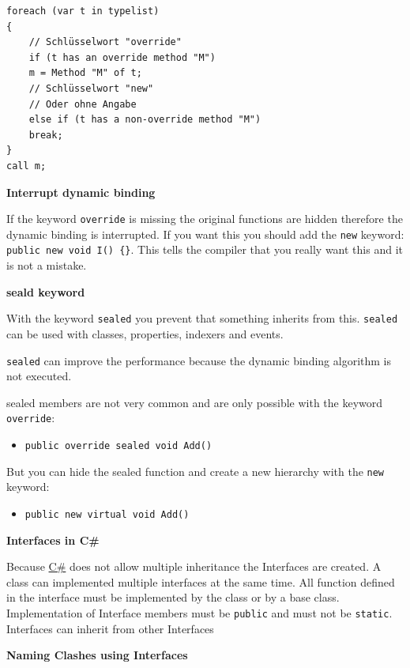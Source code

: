 \documentclass[11pt,twoside,landscape]{article}
\begin{document}
\begin{multicols}{3}
\begin{lstlisting}
foreach (var t in typelist)
{
    // Schlüsselwort "override"
    if (t has an override method "M")
	m = Method "M" of t;
    // Schlüsselwort "new"
    // Oder ohne Angabe
    else if (t has a non-override method "M")
	break;
}
call m;
\end{lstlisting}

\textbf{Interrupt dynamic binding}

If the keyword \texttt{override} is missing the original functions are hidden therefore the dynamic binding is interrupted.
If you want this you should add the \texttt{new} keyword: \texttt{public new void I() \{\}}.
This tells the compiler that you really want this and it is not a mistake.

\textbf{seald keyword}

With the keyword \texttt{sealed} you prevent that something inherits from this.
\texttt{sealed} can be used with classes, properties, indexers and events.

\texttt{sealed} can improve the performance because the dynamic binding algorithm is not executed.

sealed members are not very common and are only possible with the keyword \texttt{override}:
\begin{itemize}
\item \texttt{public override sealed void Add()}
\end{itemize}


But you can hide the sealed function and create a new hierarchy with the \texttt{new} keyword:
\begin{itemize}
\item \texttt{public new virtual void Add()}
\end{itemize}


\textbf{Interfaces in C\#}

Because \href{../../../roam/20211003114158-c.org}{C\#} does not allow multiple inheritance the Interfaces are created.
A class can implemented multiple interfaces at the same time.
All function defined in the interface must be implemented by the class or by a base class.
Implementation of Interface members must be \texttt{public} and must not be \texttt{static}.
Interfaces can inherit from other Interfaces

\textbf{Naming Clashes using Interfaces}


\end{multicols}
\end{document}
